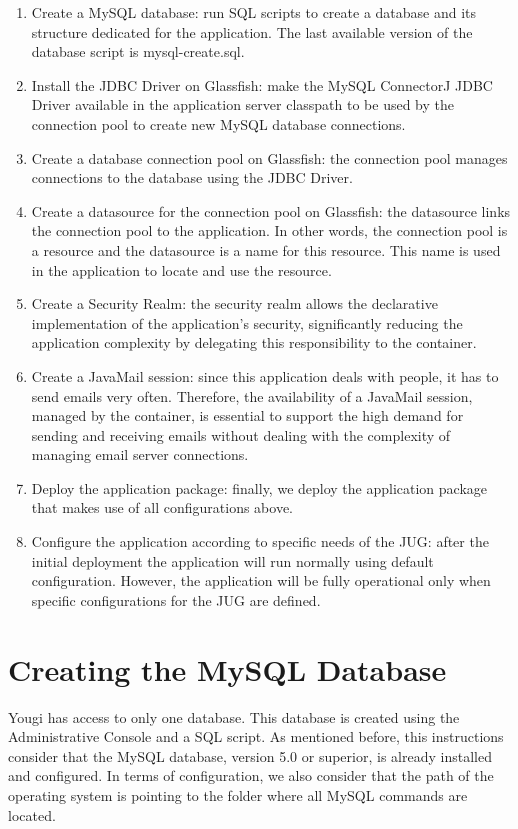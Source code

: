 \documentclass[envcountsame,envcountchap]{svmono}
\begin{document}
\begin{enumerate}
\item Create a MySQL database: run SQL scripts to create a database and its structure dedicated for the application. The last available version of the database script is mysql-create.sql.
\item Install the JDBC Driver on Glassfish: make the MySQL ConnectorJ JDBC Driver available in the application server classpath to be used by the connection pool to create new MySQL database connections.
\item Create a database connection pool on Glassfish: the connection pool manages connections to the database using the JDBC Driver.
\item Create a datasource for the connection pool on Glassfish: the datasource links the connection pool to the application. In other words, the connection pool is a resource and the datasource is a name for this resource. This name is used in the application to locate and use the resource.
\item Create a Security Realm: the security realm allows the declarative implementation of the application's security, significantly reducing the application complexity by delegating this responsibility to the container.
\item Create a JavaMail session: since this application deals with people, it has to send emails very often. Therefore, the availability of a JavaMail session, managed by the container, is essential to support the high demand for sending and receiving emails without dealing with the complexity of managing email server connections.
\item Deploy the application package: finally, we deploy the application package that makes use of all configurations above.
\item Configure the application according to specific needs of the JUG: after the initial deployment the application will run normally using default configuration. However, the application will be fully operational only when specific configurations for the JUG are defined.
\end{enumerate}

\section{Creating the MySQL Database}

Yougi has access to only one database. This database is created using the Administrative Console and a SQL script. As mentioned before, this instructions consider that the MySQL database, version 5.0 or superior, is already installed and configured. In terms of configuration, we also consider that the path of the operating system is pointing to the folder where all MySQL commands are located.
\end{document}
